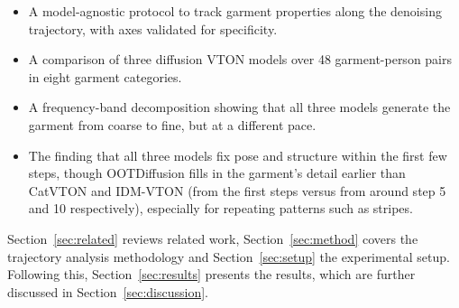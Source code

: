 \begin{itemize}
  \item A model-agnostic protocol to track garment properties along the
        denoising trajectory, with axes validated for specificity.
  \item A comparison of three diffusion VTON models over 48 garment-person pairs in eight garment categories.
  \item A frequency-band decomposition showing
that all three models generate the garment
from coarse to fine, but at a different pace.
  \item The finding that all three models fix pose and structure within the first few steps, though OOTDiffusion fills in the garment's detail earlier than CatVTON and IDM-VTON (from the first steps versus from around step 5 and 10 respectively), especially for repeating patterns such as stripes. 
\end{itemize}
\vspace{\baselineskip}
Section~\ref{sec:related} reviews related work, Section~\ref{sec:method} covers the trajectory analysis methodology and Section~\ref{sec:setup} the experimental setup. Following this, Section~\ref{sec:results} presents the results, which are further discussed in Section~\ref{sec:discussion}.
